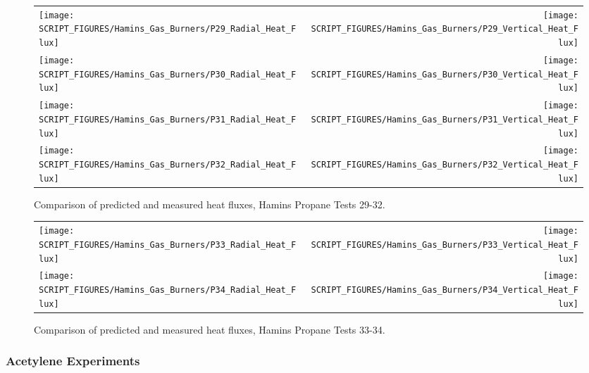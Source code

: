 \begin{figure}[p]
\begin{tabular*}{\textwidth}{l@{\extracolsep{\fill}}r}
\texttt{[image: SCRIPT\_FIGURES/Hamins\_Gas\_Burners/P29\_Radial\_Heat\_Flux]} &
\texttt{[image: SCRIPT\_FIGURES/Hamins\_Gas\_Burners/P29\_Vertical\_Heat\_Flux]} \\
\texttt{[image: SCRIPT\_FIGURES/Hamins\_Gas\_Burners/P30\_Radial\_Heat\_Flux]} &
\texttt{[image: SCRIPT\_FIGURES/Hamins\_Gas\_Burners/P30\_Vertical\_Heat\_Flux]} \\
\texttt{[image: SCRIPT\_FIGURES/Hamins\_Gas\_Burners/P31\_Radial\_Heat\_Flux]} &
\texttt{[image: SCRIPT\_FIGURES/Hamins\_Gas\_Burners/P31\_Vertical\_Heat\_Flux]} \\
\texttt{[image: SCRIPT\_FIGURES/Hamins\_Gas\_Burners/P32\_Radial\_Heat\_Flux]} &
\texttt{[image: SCRIPT\_FIGURES/Hamins\_Gas\_Burners/P32\_Vertical\_Heat\_Flux]}
\end{tabular*}
\label{Hamins_Propane_29-32}
\caption[Heat flux predictions, Hamins propane burner Tests 29-32]
{Comparison of predicted and measured heat fluxes, Hamins Propane Tests 29-32.}
\end{figure}

\begin{figure}[p]
\begin{tabular*}{\textwidth}{l@{\extracolsep{\fill}}r}
\texttt{[image: SCRIPT\_FIGURES/Hamins\_Gas\_Burners/P33\_Radial\_Heat\_Flux]} &
\texttt{[image: SCRIPT\_FIGURES/Hamins\_Gas\_Burners/P33\_Vertical\_Heat\_Flux]} \\
\texttt{[image: SCRIPT\_FIGURES/Hamins\_Gas\_Burners/P34\_Radial\_Heat\_Flux]} &
\texttt{[image: SCRIPT\_FIGURES/Hamins\_Gas\_Burners/P34\_Vertical\_Heat\_Flux]}
\end{tabular*}
\label{Hamins_Propane_33-34}
\caption[Heat flux predictions, Hamins propane burner Tests 33-34]
{Comparison of predicted and measured heat fluxes, Hamins Propane Tests 33-34.}
\end{figure}

\clearpage

\subsubsection{Acetylene Experiments}

